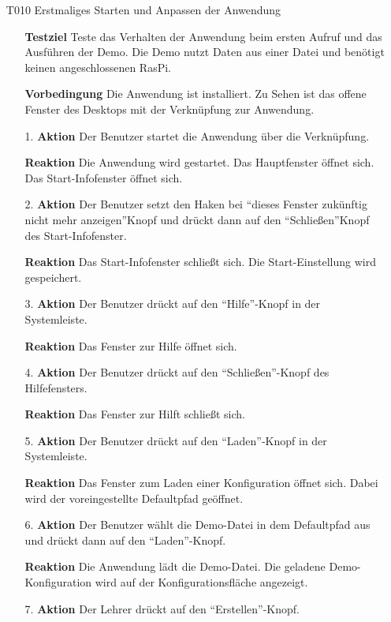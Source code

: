 \documentclass[parskip=full]{scrartcl}
\begin{document}
\begin{itemize} 

\item[T010] Erstmaliges Starten und Anpassen der Anwendung 
\begin{itemize}

\item []\textbf{Testziel} Teste das Verhalten der Anwendung beim ersten Aufruf und das Ausführen der Demo. Die Demo nutzt Daten aus einer Datei und benötigt keinen angeschlossenen \gls{RasPi}.

\item []\textbf{Vorbedingung} Die Anwendung ist installiert. Zu Sehen ist das offene Fenster des Desktops mit der Verknüpfung zur Anwendung.
\item [1.]\textbf{Aktion} Der Benutzer startet die Anwendung über die Verknüpfung.
\item []\textbf{Reaktion} Die Anwendung wird gestartet. Das Hauptfenster öffnet sich. Das Start-Infofenster öffnet sich.
\item [2.]\textbf{Aktion} Der Benutzer setzt den Haken bei "`dieses Fenster zukünftig nicht mehr anzeigen"'Knopf und drückt dann auf den "`Schließen"'Knopf des Start-Infofenster.
\item []\textbf{Reaktion} Das Start-Infofenster schließt sich. Die Start-Einstellung wird gespeichert. 
\item [3.]\textbf{Aktion} Der Benutzer drückt auf den "`Hilfe"'-Knopf in der Systemleiste.
\item []\textbf{Reaktion} Das Fenster zur Hilfe öffnet sich.
\item [4.]\textbf{Aktion} Der Benutzer drückt auf den "`Schließen"'-Knopf des Hilfefensters.
\item []\textbf{Reaktion} Das Fenster zur Hilft schließt sich.
\item [5.]\textbf{Aktion} Der Benutzer drückt auf den "`Laden"'-Knopf in der Systemleiste.
\item []\textbf{Reaktion} Das Fenster zum Laden einer Konfiguration öffnet sich. Dabei wird der voreingestellte Defaultpfad geöffnet. 
\item [6.]\textbf{Aktion} Der Benutzer wählt die Demo-Datei in dem Defaultpfad aus und drückt dann auf den "`Laden"'-Knopf. 
\item []\textbf{Reaktion} Die Anwendung lädt die Demo-Datei. Die geladene Demo-Konfiguration wird auf der Konfigurationsfläche angezeigt.
\item [7.]\textbf{Aktion} Der Lehrer drückt auf den "`Erstellen"'-Knopf.

\end{itemize}
\end{itemize}
\end{document}
